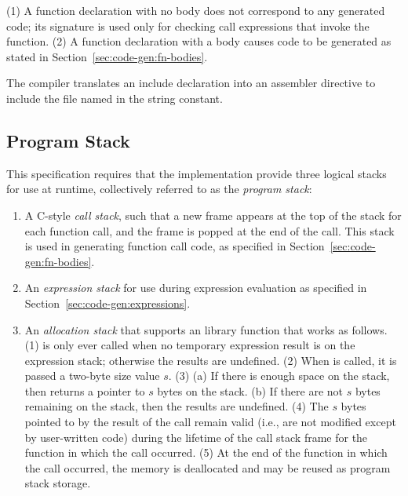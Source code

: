 \documentclass[10pt]{article}
\begin{document}
 (1) A function declaration with no
body does not correspond to any generated code; its signature is used
only for checking call expressions that invoke the function.  (2) A
function declaration with a body causes code to be generated as stated
in Section~\ref{sec:code-gen:fn-bodies}.

  The compiler translates an include
declaration into an assembler directive to include the file named in
the string constant.

\subsection{Program Stack}
\label{sec:code-gen:program-stack}

This specification requires that the implementation provide three
logical stacks for use at runtime, collectively referred to as the
\emph{program stack}:
%
\begin{enumerate}
%
\item A C-style \emph{call stack}, such that a new frame appears at
  the top of the stack for each function call, and the frame is popped
  at the end of the call.  This stack is used in generating function
  call code, as specified in Section~\ref{sec:code-gen:fn-bodies}.
%
\item An \emph{expression stack} for use during expression evaluation
  as specified in Section~\ref{sec:code-gen:expressions}.
%
\item An \emph{allocation stack} that supports an 
  library function that works as follows.  (1)  is only
  ever called when no temporary expression result is on the expression
  stack; otherwise the results are undefined.  (2) When 
  is called, it is passed a two-byte size value $s$.  (3) (a) If there
  is enough space on the stack, then  returns a pointer
  to $s$ bytes on the stack. (b) If there are not $s$ bytes remaining
  on the stack, then the results are undefined. (4) The $s$ bytes
  pointed to by the result of the  call remain valid
  (i.e., are not modified except by user-written code) during the
  lifetime of the call stack frame for the function in which the
   call occurred.  (5) At the end of the function in
  which the  call occurred, the memory is deallocated
  and may be reused as program stack storage.
%
\end{enumerate}
\end{document}
